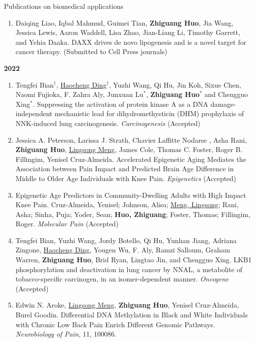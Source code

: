 \documentclass{resume} %
\begin{document}
\begin{rSection}{Publications on biomedical applications}
\begin{enumerate}[noitemsep,topsep=0pt]
\item  Daiqing Liao, Iqbal Mahmud, Guimei Tian, {\bf Zhiguang Huo}, Jia Wang, Jessica Lewis, Aaron Waddell, Lisa Zhao, Jian-Liang Li, Timothy Garrett, and Yehia Daaka. 
DAXX drives de novo lipogenesis and is a novel target for cancer therapy. 
(Submitted to Cell Press journals)

\end{enumerate}

\textbf{2022}
\begin{enumerate}[noitemsep,topsep=0pt, resume]

\item
Tengfei Bian$^\dagger$, \underline{Haocheng Ding}$^\dagger$, Yuzhi Wang, Qi Hu, Jin Koh, Sixue Chen, Naomi Fujioka, F. Zahra Aly, Junxuan Lu$^*$, {\bf Zhiguang Huo}$^*$ and Chengguo Xing$^*$.
Suppressing the activation of protein kinase A as a DNA damage-independent mechanistic lead for dihydromethysticin (DHM) prophylaxis of NNK-induced lung carcinogenesis.
\emph{Carcinogenesis} (Accepted)

\item
Jessica A. Peterson, Larissa J. Strath, Chavier Laffitte Nodarse , Asha Rani, {\bf Zhiguang Huo}, \underline{Lingsong Meng}, James Cole, Thomas C. Foster, Roger B. Fillingim, Yenisel Cruz-Almeida. 
Accelerated Epigenetic Aging Mediates the Association between Pain Impact and Predicted Brain Age Difference in Middle to Older Age Individuals with Knee Pain.  
\emph{Epigenetics} (Accepted)

\item Epigenetic Age Predictors in Community-Dwelling Adults with High Impact Knee Pain.
Cruz-Almeida, Yenisel; Johnson, Alisa; \underline{Meng, Lingsong}; Rani, Asha; Sinha, Puja; Yoder, Sean; {\bf Huo, Zhiguang}; Foster, Thomas; Fillingim, Roger.
\emph{Molecular Pain} (Accepted)

\item
Tengfei Bian, Yuzhi Wang, Jordy Botello, Qi Hu, Yunhan Jiang, Adriana Zingone, \underline{Haocheng Ding}, Yougen Wu, F. Aly, Ramzi Salloum, Graham Warren, {\bf Zhiguang Huo}, Brid Ryan, Lingtao Jin, and Chengguo Xing. 
LKB1 phosphorylation and deactivation in lung cancer by NNAL, a metabolite of tobacco-specific carcinogen, in an isomer-dependent manner.
\emph{Oncogene} (Accepted)

\item
Edwin N. Aroke, \underline{Lingsong Meng}, {\bf Zhiguang Huo}, Yenisel Cruz-Almeida, Burel Goodin.
Differential DNA Methylation in Black and White Individuals with Chronic Low Back Pain Enrich Different Genomic Pathways. 
\emph{Neurobiology of Pain}, 11, 100086.


\end{enumerate}
\end{rSection}
\end{document}
